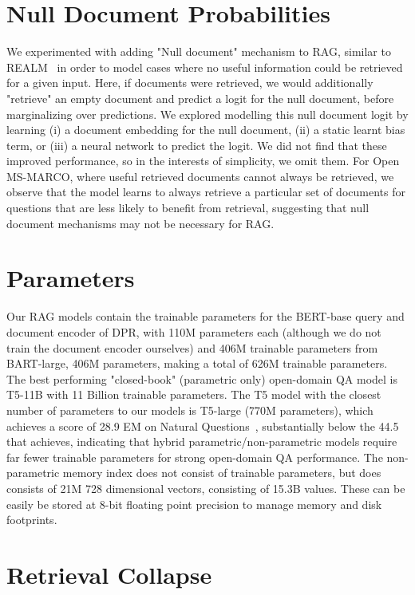 \documentclass{article}
\begin{document}
\section{Null Document Probabilities}

We experimented with adding "Null document" mechanism to RAG, similar to REALM~\cite{guu2020realm} in order to model cases where no useful information could be retrieved for a given input. Here, if  documents were retrieved, we would additionally "retrieve" an empty document and predict a logit for the null document, before marginalizing over  predictions. We explored modelling this null document logit by learning (i) a document embedding for the null document, (ii) a static learnt bias term, or (iii) a neural network to predict the logit. We did not find that these improved performance, so in the interests of simplicity, we omit them. For Open MS-MARCO, where useful retrieved documents cannot always be retrieved, we observe that the model learns to always retrieve a particular set of documents for questions that are less likely to benefit from retrieval, suggesting that null document mechanisms may not be necessary for RAG. 

\section{Parameters}

Our RAG models contain the trainable parameters for the BERT-base query and document encoder of DPR, with 110M parameters each (although we do not train the document encoder ourselves) and 406M trainable parameters from BART-large, 406M parameters, making a total of 626M trainable parameters. The best performing "closed-book" (parametric only) open-domain QA model is T5-11B with 11 Billion trainable parameters. The T5 model with the closest number of parameters to our models is T5-large (770M parameters), which achieves a score of 28.9 EM on Natural Questions~\cite{roberts2020t5cqba}, substantially below the 44.5 that \raganswer{} achieves, indicating that hybrid parametric/non-parametric models require far fewer trainable parameters for strong open-domain QA performance. The non-parametric memory index does not consist of trainable parameters, but does consists of 21M 728 dimensional vectors, consisting of 15.3B values. These can be easily be stored at 8-bit floating point precision to manage memory and disk footprints.

\section{Retrieval Collapse}
\end{document}
